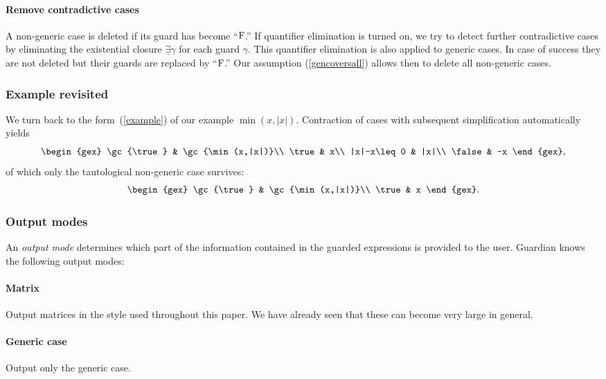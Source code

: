 \paragraph{Remove contradictive cases} A non-generic case is  deleted if
its guard has become ``$\textrm{F}$.'' If quantifier elimination is turned
on, we try to detect further contradictive cases by eliminating the
existential closure $\underline\exists\gamma$ for each guard $\gamma$.
This quantifier elimination is also applied to generic cases. In case
of success they are not deleted but their guards are replaced by
``$\textrm{F}$.'' Our assumption (\ref{gencoversall}) allows then to
delete all non-generic cases.

\subsubsection{Example revisited}
We turn back to the form~(\ref{example}) of our example $\min(x,|x|)$.
Contraction of cases with subsequent simplification automatically
yields
$$
\begin{gex}
\gc{\true} & \gc{\min(x,|x|)}\\
\true & x\\
|x|-x\leq 0 & |x|\\
\false & -x
\end{gex},
$$
of which only the tautological non-generic case survives:
\begin{equation}
\begin{gex}
\gc{\true} & \gc{\min(x,|x|)}\\
\true & x
\end{gex}.\label{minabs}
\end{equation}

\subsubsection{Output modes}
An {\em output mode} determines which part of the information
contained in the guarded expressions is provided to the user. {\sc
Guardian} knows the following output modes:

\paragraph{Matrix} Output matrices in the style used throughout this
paper. We have already seen that these can become very large in
general.
\paragraph{Generic case} Output only the generic case.
